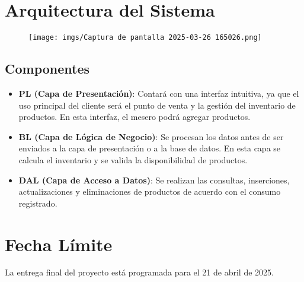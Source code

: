 \documentclass{article}
\begin{document}
\section{Arquitectura del Sistema}
\begin{figure}
    \texttt{[image: imgs/Captura de pantalla 2025-03-26 165026.png]}
\end{figure}
\subsection{Componentes}
\begin{itemize}
\item \textbf{PL (Capa de Presentación)}: Contará con una interfaz intuitiva, ya que el uso principal del cliente será el punto de venta y la gestión del inventario de productos. En esta interfaz, el mesero podrá agregar productos.
\item \textbf{BL (Capa de Lógica de Negocio)}: Se procesan los datos antes de ser enviados a la capa de presentación o a la base de datos. En esta capa se calcula el inventario y se valida la disponibilidad de productos.
\item \textbf{DAL (Capa de Acceso a Datos)}: Se realizan las consultas, inserciones, actualizaciones y eliminaciones de productos de acuerdo con el consumo registrado.
\end{itemize}

\section{Fecha Límite}
La entrega final del proyecto está programada para el 21 de abril de 2025.
\end{document}
